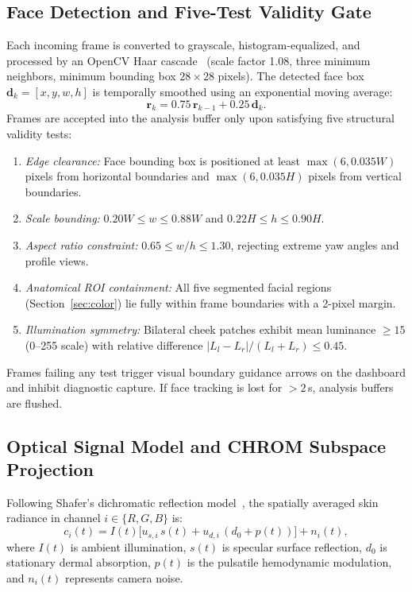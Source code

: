 \documentclass[journal]{IEEEtran}
\begin{document}
\subsection{Face Detection and Five-Test Validity Gate}
Each incoming frame is converted to grayscale, histogram-equalized, and processed by an OpenCV Haar cascade~\cite{viola2001} (scale factor 1.08, three minimum neighbors, minimum bounding box $28 \times 28$ pixels). The detected face box $\mathbf{d}_k = [x, y, w, h]$ is temporally smoothed using an exponential moving average:
\begin{equation}
  \mathbf{r}_k = 0.75\,\mathbf{r}_{k-1} + 0.25\,\mathbf{d}_k.
  \label{eq:box_smooth}
\end{equation}
Frames are accepted into the analysis buffer only upon satisfying five structural validity tests:
\begin{enumerate}
  \item \emph{Edge clearance:} Face bounding box is positioned at least $\max(6, 0.035W)$ pixels from horizontal boundaries and $\max(6, 0.035H)$ pixels from vertical boundaries.
  \item \emph{Scale bounding:} $0.20W \le w \le 0.88W$ and $0.22H \le h \le 0.90H$.
  \item \emph{Aspect ratio constraint:} $0.65 \le w/h \le 1.30$, rejecting extreme yaw angles and profile views.
  \item \emph{Anatomical ROI containment:} All five segmented facial regions (Section~\ref{sec:color}) lie fully within frame boundaries with a 2-pixel margin.
  \item \emph{Illumination symmetry:} Bilateral cheek patches exhibit mean luminance $\ge 15$ (0--255 scale) with relative difference $|L_l - L_r|/(L_l + L_r) \le 0.45$.
\end{enumerate}
Frames failing any test trigger visual boundary guidance arrows on the dashboard and inhibit diagnostic capture. If face tracking is lost for $>2$\,s, analysis buffers are flushed.

\subsection{Optical Signal Model and CHROM Subspace Projection}
Following Shafer's dichromatic reflection model~\cite{shafer1985}, the spatially averaged skin radiance in channel $i \in \{R, G, B\}$ is:
\begin{equation}
  c_i(t) = I(t)\big[u_{s,i}\, s(t) + u_{d,i}\,(d_0 + p(t))\big] + n_i(t),
  \label{eq:reflection}
\end{equation}
where $I(t)$ is ambient illumination, $s(t)$ is specular surface reflection, $d_0$ is stationary dermal absorption, $p(t)$ is the pulsatile hemodynamic modulation, and $n_i(t)$ represents camera noise.
\end{document}
